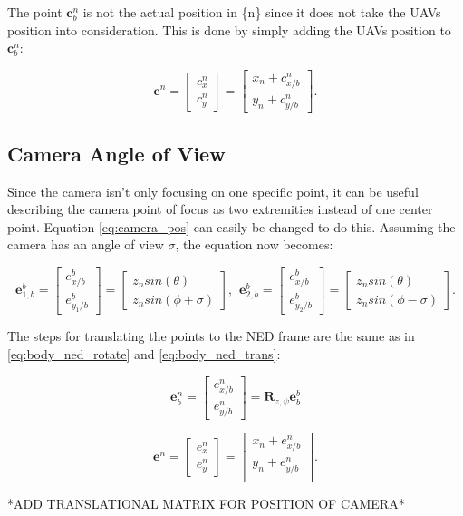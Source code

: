 The point $\bm{c}_b^n$ is not the actual position in \{n\} since it does not take the UAVs position into consideration. This is done by simply adding the UAVs position to $\bm{c}_b^n$:

\begin{equation} \label{eq:body_ned_trans}
	\bm{c}^n =
	\begin{bmatrix}
		c_x^n \\ c_y^n
	\end{bmatrix}
	=
	\begin{bmatrix}
		x_n + c_{x/b}^n \\
		y_n + c_{y/b}^n
	\end{bmatrix}.
\end{equation}

\subsection{Camera Angle of View}
Since the camera isn't only focusing on one specific point, it can be useful describing the camera point of focus as two extremities instead of one center point. Equation \eqref{eq:camera_pos} can easily be changed to do this. Assuming the camera has an angle of view $\sigma$, the equation now becomes:

\begin{equation}
	\bm{e}_{1,b}^b = 
	\begin{bmatrix}
		e^b_{x/b} \\ e^b_{y_1/b}
	\end{bmatrix}
	=
	\begin{bmatrix}
		z_n sin(\theta)\\
		z_n sin(\phi + \sigma)
	\end{bmatrix}
	, \hspace{5pt}
	\bm{e}_{2,b}^b = 
	\begin{bmatrix}
		e^b_{x/b} \\ e^b_{y_2/b}
	\end{bmatrix}
	=
	\begin{bmatrix}
		z_n sin(\theta)\\
		z_n sin(\phi - \sigma)
	\end{bmatrix}.
\end{equation}

The steps for translating the points to the NED frame are the same as in \eqref{eq:body_ned_rotate} and \eqref{eq:body_ned_trans}:

\begin{equation}
	\bm{e}_b^n =
	\begin{bmatrix}
		e^n_{x/b} \\ e^n_{y/b}
	\end{bmatrix}
	= \bm{R}_{z,\psi} \bm{e}_b^b
\end{equation}

\begin{equation}
	\bm{e}^n =
	\begin{bmatrix}
		e^n_{x} \\ e^n_{y}
	\end{bmatrix}
	=
	\begin{bmatrix}
		x_n + e^n_{x/b} \\
		y_n + e^n_{y/b} \\
	\end{bmatrix}.
\end{equation}
	
*ADD TRANSLATIONAL MATRIX FOR POSITION OF CAMERA*